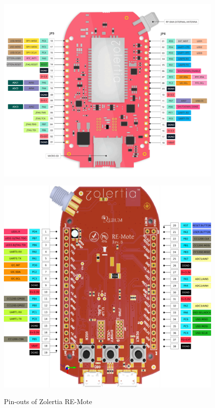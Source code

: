 \documentclass[a4paper]{article}
\begin{document}
\begin{figure}
\begin{minipage}{0.5\textwidth}
  \centering
  \includegraphics[width=1\textwidth]{images/reva-pins.pdf}
  \label{fig:revapins}
\end{minipage}
\begin{minipage}{0.5\textwidth}
  \centering
  \includegraphics[width=1\textwidth]{images/revb-pins.pdf}
  \label{fig:revbpins}
\end{minipage}
\caption{Pin-outs of Zolertia RE-Mote}
\end{figure}
\end{document}
